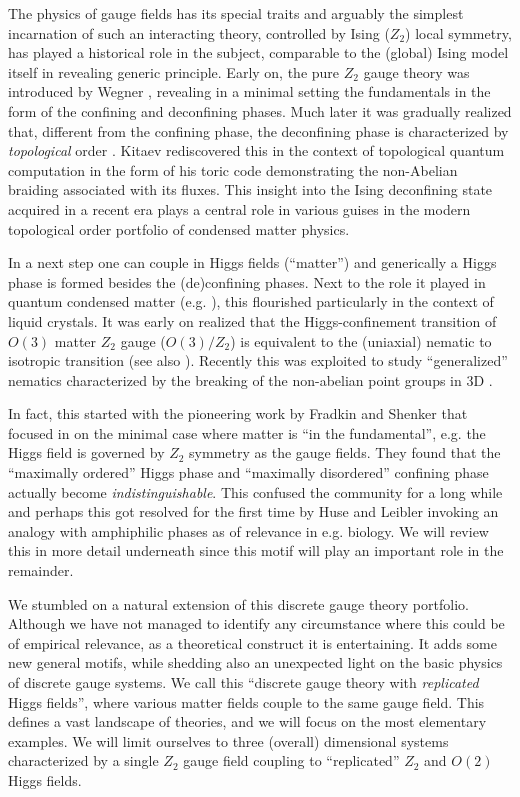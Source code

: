 The physics of gauge fields has its special traits and arguably the simplest incarnation of such an interacting theory, controlled by Ising ($Z_2$) local symmetry, has played a historical role in the subject, comparable to the (global) Ising model itself  in revealing generic principle. Early on, the pure $Z_2$ gauge theory was introduced by Wegner \cite{Wegner,Kogut}, revealing in a minimal setting the fundamentals in the form of the confining and deconfining phases. Much later it was gradually realized that, different from the confining phase, the deconfining phase is characterized by {\em topological} order \cite{Wen,Bais,Sondhi,visons,stripefrac,stripefracdemler}. Kitaev rediscovered this in the context of topological quantum computation in the form of his toric code \cite{Kitaev} demonstrating the non-Abelian braiding associated with its fluxes. This insight into the Ising deconfining state acquired in a recent era plays a central role in various guises in the modern topological order portfolio of condensed matter physics. 

In a next step one can couple in Higgs fields (``matter'') and generically a Higgs phase is formed besides the (de)confining phases.  Next to the role it played in quantum condensed matter (e.g. \cite{Sondhi,visons}), this flourished particularly in the context of liquid crystals. It was early on realized that the Higgs-confinement transition of $O(3)$ matter $Z_2$ gauge ($O(3)/Z_2$) is equivalent to the (uniaxial) nematic to isotropic transition \cite{toner95} (see also \cite{stripefrac,stripefracdemler}). Recently this was exploited to study ``generalized'' nematics characterized by the breaking of the non-abelian point groups in 3D \cite{nonabnematic}. 

In fact, this started with the pioneering work by Fradkin and Shenker \cite{Fradkinshenker} that focused in on the minimal case where matter is ``in the fundamental'', e.g. the Higgs field is governed by $Z_2$ symmetry as the gauge fields. They found that the ``maximally ordered'' Higgs phase and ``maximally disordered'' confining phase actually become {\em indistinguishable}. This confused the community for a long while and perhaps this got resolved for the first time by Huse and Leibler  \cite{HuseLeibler} invoking an analogy with amphiphilic phases as of relevance in e.g. biology. We will review this in more detail underneath since this motif will play an important role in the remainder. 

We stumbled on a natural extension of this discrete gauge theory portfolio. Although we have not managed to identify any circumstance where this could be of empirical relevance, as a theoretical construct it is entertaining. It adds some new general motifs, while shedding also an unexpected light on the basic physics of discrete gauge systems.   We call this ``discrete gauge theory with \textit{replicated} Higgs fields'', where various matter fields couple to the same gauge field. This defines a vast landscape of theories, and we will focus on the most elementary examples. We will limit ourselves to three (overall) dimensional systems characterized  by a single $Z_2$ gauge field coupling to ``replicated'' $Z_2$ and $O(2)$ Higgs fields.

